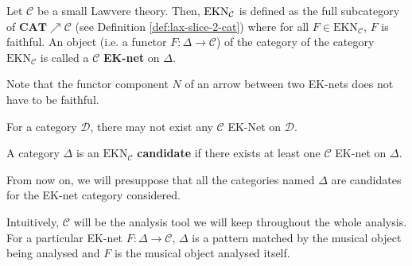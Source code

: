 \begin{defn}[EK-nets]
    Let $\mathcal{C}$ be a small Lawvere theory. Then, $\bf \text{EKN}_\mathcal{C}$ \label{nomencl:EKN} is defined as the full subcategory of $\textbf{CAT}\nearrow \mathcal{C}$ (see Definition \ref{def:lax-slice-2-cat}) where for all $F\in \text{EKN}_\mathcal{C}$, $F$ is faithful. An object (i.e. a functor $F : \Delta \rightarrow \mathcal{C}$) of the category of the category $\text{EKN}_\mathcal{C}$ is called a $\mathcal{C}$ \textbf{EK-net} on  $\Delta$.
\end{defn}

\begin{rem}
    Note that the functor component $N$ of an arrow between two EK-nets does not have to be faithful.
\end{rem}

For a category $\mathcal{D}$, there may not exist any $\mathcal{C}$ EK-Net on  $\mathcal{D}$.
\begin{defn}[EK candidate]
    A category $\Delta$ is an $\text{EKN}_{\mathcal{C}}$ \textbf{candidate} if there exists at least one $\mathcal{C}$ EK-net on $\Delta$.
\end{defn}

\begin{note}
    From now on, we will presuppose that all the categories named $\Delta$ are candidates for the EK-net category considered.
\end{note}

Intuitively, $\mathcal{C}$ will be the analysis tool we will keep throughout the whole analysis. For a particular EK-net $F : \Delta \rightarrow \mathcal{C}$, $\Delta$ is a pattern matched by the musical object being analysed and $F$ is the musical object analysed itself.







